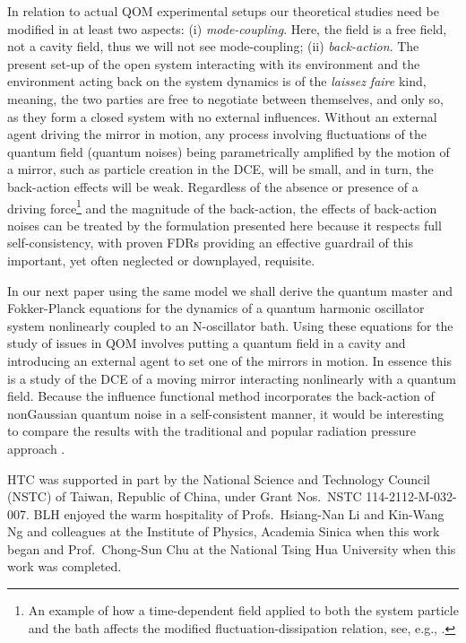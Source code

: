 \documentclass[%
amssymb,preprint,preprintnumbers,nofootinbib,superscriptaddress]{revtex4}
\begin{document}
In relation to actual QOM experimental setups our theoretical studies need be modified in at least two aspects: (i)   \textit{mode-coupling}. Here, the field is a free field, not a cavity field, thus we will not see mode-coupling; (ii) \textit{back-action}. The present set-up of the open system interacting with its environment and the environment acting back on the system dynamics is of the \textit{laissez faire} kind, meaning, the two parties are free to  negotiate between themselves, and only so, as they form a closed system with no external influences.  Without an external agent driving the mirror in motion, any process involving fluctuations of the quantum field (quantum noises) being  parametrically amplified by the motion of a mirror, such as particle creation in the DCE, will be small, and in turn, the back-action effects will be weak. Regardless of the absence or presence of a driving force\footnote{An example of how a time-dependent field applied to both the system particle and the bath affects the modified fluctuation-dissipation relation, see, e.g., \cite{Zaccone}.} and the magnitude of the back-action, the effects of back-action noises can be treated by the formulation presented here because it respects full self-consistency, with proven FDRs providing an effective guardrail of this important, yet often neglected or downplayed, requisite.  

In our next paper using the same model we shall derive the quantum master and  Fokker-Planck equations for the dynamics of a  quantum harmonic oscillator system nonlinearly coupled to an N-oscillator bath. Using these equations for the study of issues in QOM involves putting a quantum field in a cavity and introducing an external agent to set one of the mirrors in motion. In essence this is a study of the DCE of a moving mirror interacting nonlinearly with a quantum field. Because the influence functional method incorporates the back-action of nonGaussian quantum noise in a self-consistent manner, it would be interesting to compare the results with the traditional and popular radiation pressure approach \cite{Law,But25}. 
 

%
\acknowledgments HTC was supported in part by the National Science and Technology Council (NSTC) of Taiwan, Republic of China, under Grant Nos.~NSTC 114-2112-M-032-007. BLH enjoyed the warm hospitality of Profs.~Hsiang-Nan Li and Kin-Wang Ng and colleagues at the Institute of Physics, Academia Sinica when this work began and Prof.~Chong-Sun Chu at the National Tsing Hua University when this work was completed.   
\end{document}
